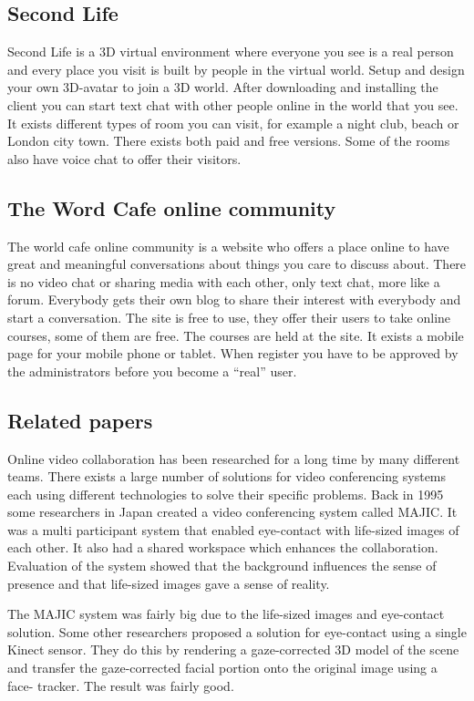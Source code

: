 \documentclass[12pt, titlepage]{article}
\begin{document}
\subsection{Second Life}
Second Life\cite{3} is a 3D virtual environment where everyone you see is a real person and every place you visit is built by people in the virtual world. Setup and design your own 3D-avatar to join a 3D world. After downloading and installing the client you can start text chat with other people online in the world that you see. It exists different types of room you can visit, for example a night club, beach or London city town. There exists both paid and free versions. Some of the rooms also have voice chat to offer their visitors.
\subsection{The Word Cafe online community}
The world cafe online community\cite{8} is a website who offers a place online to have great and meaningful conversations about things you care to discuss about. There is no video chat or sharing media with each other, only text chat, more like a forum. Everybody gets their own blog to share their interest with everybody and start a conversation. The site is free to use, they offer their users to take online courses, some of them are free. The courses are held at the site. It exists a mobile page for your mobile phone or tablet. When register you have to be approved by the administrators before you become a “real” user.

\subsection{Related papers}
Online video collaboration has been researched for a long time by many different teams. There exists a large number of solutions for video conferencing systems each using different technologies to solve their specific problems. Back in 1995 some researchers in Japan created a video conferencing system called MAJIC\cite{17}. It was a multi participant system that enabled eye-contact with life-sized images of each other. It also had a shared workspace which enhances the collaboration. Evaluation of the system showed that the background influences the sense of presence and that life-sized images gave a sense of reality.

The MAJIC system was fairly big due to the life-sized images and eye-contact solution. Some other researchers proposed a solution for eye-contact using a single Kinect sensor\cite{21}. They do this by rendering a gaze-corrected 3D model of the scene and transfer the gaze-corrected facial portion onto the original image using a face- tracker. The result was fairly good.
\end{document}
